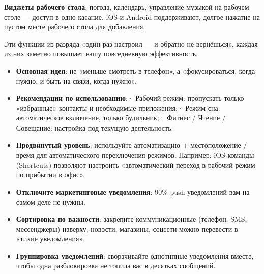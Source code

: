 \textbf{Виджеты рабочего стола}: погода, календарь, управление музыкой на рабочем столе — доступ в одно касание. iOS и Android поддерживают, долгое нажатие на пустом месте рабочего стола для добавления.


Эти функции из разряда «один раз настроил — и обратно не вернёшься», каждая из них заметно повышает вашу повседневную эффективность.


\begin{itemize}
  \item \textbf{Основная идея}: не «меньше смотреть в телефон», а «фокусироваться, когда нужно, и быть на связи, когда нужно».
  \item \textbf{Рекомендации по использованию}:\newline · Рабочий режим: пропускать только «избранные» контакты и необходимые приложения;\newline · Режим сна: автоматическое включение, только будильник;\newline · Фитнес / Чтение / Совещание: настройка под текущую деятельность.
  \item \textbf{Продвинутый уровень}: используйте автоматизацию + местоположение / время для автоматического переключения режимов. Например: iOS-команды (Shortcuts) позволяют настроить «автоматический переход в рабочий режим по прибытии в офис».
\end{itemize}


\begin{itemize}
  \item \textbf{Отключите маркетинговые уведомления}: 90\% push-уведомлений вам на самом деле не нужны.
  \item \textbf{Сортировка по важности}: закрепите коммуникационные (телефон, SMS, мессенджеры) наверху; новости, магазины, соцсети можно перевести в «тихие уведомления».
  \item \textbf{Группировка уведомлений}: сворачивайте однотипные уведомления вместе, чтобы одна разблокировка не топила вас в десятках сообщений.
\end{itemize}


